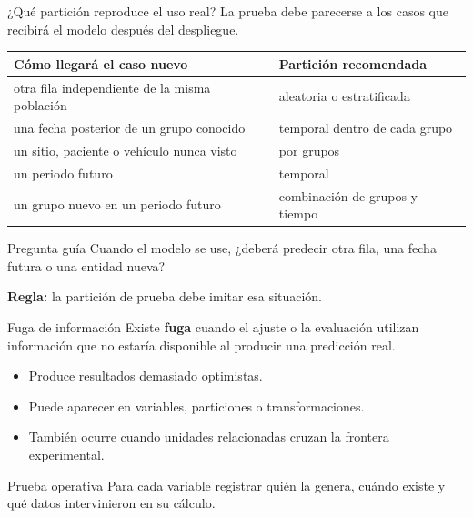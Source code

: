 \documentclass[aspectratio=169,10pt]{beamer}
\newcommand{\concepto}[1]{\textcolor{UAPTeal}{\textbf{#1}}}
\begin{document}
\begin{frame}{¿Qué partición reproduce el uso real?}
  \footnotesize
  La prueba debe parecerse a los casos que recibirá el modelo después del despliegue.

  \medskip
  \begin{tabularx}{\textwidth}{X X}
    \toprule Cómo llegará el caso nuevo & Partición recomendada \\ \midrule
    otra fila independiente de la misma población & aleatoria o estratificada \\
    una fecha posterior de un grupo conocido & temporal dentro de cada grupo \\
    un sitio, paciente o vehículo nunca visto & por grupos \\
    un periodo futuro & temporal \\
    un grupo nuevo en un periodo futuro & combinación de grupos y tiempo \\
    \bottomrule
  \end{tabularx}
  \begin{block}{Pregunta guía}
    Cuando el modelo se use, ¿deberá predecir otra fila, una fecha futura o una entidad nueva?
  \end{block}
  \textbf{Regla:} la partición de prueba debe imitar esa situación.
\end{frame}

\begin{frame}{Fuga de información}
  \small
  Existe \concepto{fuga} cuando el ajuste o la evaluación utilizan información que no estaría disponible al producir una predicción real.
  \begin{itemize}
    \item Produce resultados demasiado optimistas.
    \item Puede aparecer en variables, particiones o transformaciones.
    \item También ocurre cuando unidades relacionadas cruzan la frontera experimental.
  \end{itemize}
  \begin{block}{Prueba operativa}
    Para cada variable registrar quién la genera, cuándo existe y qué datos intervinieron en su cálculo.
  \end{block}
\end{frame}
\end{document}
